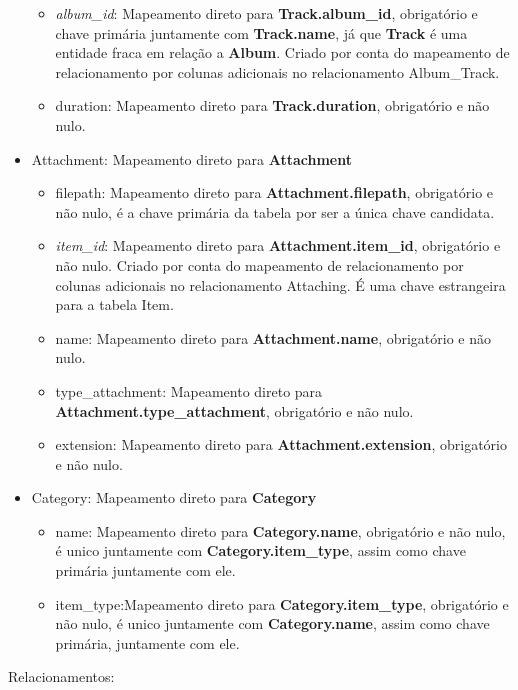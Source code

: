 \documentclass[a4paper, 11pt]{article}
\begin{document}
\begin{itemize}
\begin{itemize}
        \item \textit{album\_id}: Mapeamento direto para {\textbf{Track.album\_id}}, obrigatório e chave primária juntamente com \textbf{Track.name}, já que \textbf{Track} é uma entidade fraca em relação a \textbf{Album}. Criado por conta do mapeamento de relacionamento por colunas adicionais no relacionamento Album\_Track.
        \item duration: Mapeamento direto para {\textbf{Track.duration}}, obrigatório e não nulo.
    \end{itemize}
    \item Attachment: Mapeamento direto para {\textbf{Attachment}}
    \begin{itemize}
        \item filepath: Mapeamento direto para \textbf{Attachment.filepath}, obrigatório e não nulo, é a chave primária da tabela por ser a única chave candidata.
        \item \textit{item\_id}: Mapeamento direto para \textbf{Attachment.item\_id}, obrigatório e não nulo. Criado por conta do mapeamento de relacionamento por colunas adicionais no relacionamento Attaching. É uma chave estrangeira para a tabela Item.
        \item name: Mapeamento direto para \textbf{Attachment.name}, obrigatório e não nulo.
        \item type\_attachment: Mapeamento direto para \textbf{Attachment.type\_attachment}, obrigatório e não nulo.
        \item extension: Mapeamento direto para \textbf{Attachment.extension}, obrigatório e não nulo.
    \end{itemize}
    \item Category: Mapeamento direto para {\textbf{Category}}
    \begin{itemize}
        \item name: Mapeamento direto para \textbf{Category.name}, obrigatório e não nulo, é unico juntamente com \textbf{Category.item\_type}, assim como chave primária juntamente com ele. 
        \item item\_type:Mapeamento direto para \textbf{Category.item\_type}, obrigatório e não nulo, é unico juntamente com \textbf{Category.name}, assim como chave primária, juntamente com ele.
    \end{itemize}
\end{itemize}
\break
Relacionamentos:
\end{document}
